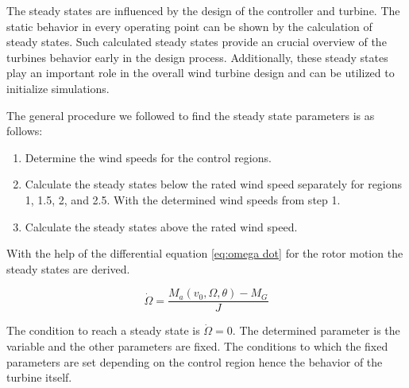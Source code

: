 
The steady states are influenced by the design of the controller and turbine.
The static behavior in every operating point can be shown by the calculation of steady states.
Such calculated steady states provide an crucial overview of the turbines behavior early in the design process.
Additionally, these steady states play an important role in the overall wind turbine design and can be utilized to initialize simulations.

The general procedure we followed to find the steady state parameters is as follows: 
\begin{enumerate}
	\item Determine the wind speeds for the control regions. 
	\item Calculate the steady states below the rated wind speed separately for regions 1, 1.5, 2, and 2.5. With the determined wind speeds from step 1.
	\item Calculate the steady states above the rated wind speed.
\end{enumerate}

With the help of the differential equation \ref{eq:omega dot} for the rotor motion the steady states are derived.

\begin{equation}
	\dot{\Omega} = \frac{M_a(v_0, \Omega, \theta) - M_G}{J}
	\label{eq:omega dot}
\end{equation}

The condition to reach a steady state is $\dot{\Omega} = 0$. The determined parameter is the variable and the other parameters are fixed. The conditions to which the fixed parameters are set depending on the control region hence the behavior of the turbine itself.

%
%
%

